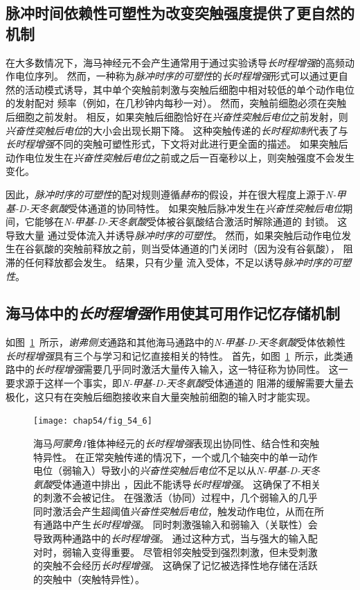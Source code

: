 \subsection{脉冲时间依赖性可塑性为改变突触强度提供了更自然的机制}

在大多数情况下，海马神经元不会产生通常用于通过实验诱导\textit{长时程增强}的高频动作电位序列。
然而，一种称为\textit{脉冲时序的可塑性}的\textit{长时程增强}形式可以通过更自然的活动模式诱导，其中单个突触前刺激与突触后细胞中相对较低的单个动作电位的发射配对 频率（例如，在几秒钟内每秒一对）。
然而，突触前细胞必须在突触后细胞之前发射。
相反，如果突触后细胞恰好在\textit{兴奋性突触后电位}之前发射，则\textit{兴奋性突触后电位}的大小会出现长期下降。
这种突触传递的\textit{长时程抑制}代表了与\textit{长时程增强}不同的突触可塑性形式，下文将对此进行更全面的描述。
如果突触后动作电位发生在\textit{兴奋性突触后电位}之前或之后一百毫秒以上，则突触强度不会发生变化。


因此，\textit{脉冲时序的可塑性}的配对规则遵循\textit{赫布}的假设，并在很大程度上源于\textit{N-甲基-D-天冬氨酸}受体通道的协同特性。
如果突触后脉冲发生在\textit{兴奋性突触后电位}期间，它能够在\textit{N-甲基-D-天冬氨酸}受体被谷氨酸结合激活时解除通道的  封锁。
这导致大量  通过受体流入并诱导\textit{脉冲时序的可塑性}。
然而，如果突触后动作电位发生在谷氨酸的突触前释放之前，则当受体通道的门关闭时（因为没有谷氨酸）， 阻滞的任何释放都会发生。
结果，只有少量  流入受体，不足以诱导\textit{脉冲时序的可塑性}。



\subsection{海马体中的\textit{长时程增强}作用使其可用作记忆存储机制}

如图~\ref{fig:54_6}~所示，\textit{谢弗侧支}通路和其他海马通路中的\textit{N-甲基-D-天冬氨酸}受体依赖性\textit{长时程增强}具有三个与学习和记忆直接相关的特性。
首先，如图~\ref{fig:54_6}~所示，此类通路中的\textit{长时程增强}需要几乎同时激活大量传入输入，这一特征称为协同性。
这一要求源于这样一个事实，即\textit{N-甲基-D-天冬氨酸}受体通道的  阻滞的缓解需要大量去极化，这只有在突触后细胞接收来自大量突触前细胞的输入时才能实现。


\begin{figure}[htbp]
	\centering
	\texttt{[image: chap54/fig\_54\_6]}
	\caption{海马\textit{阿蒙角1}锥体神经元的\textit{长时程增强}表现出协同性、结合性和突触特异性。
		在正常突触传递的情况下，一个或几个轴突中的单一动作电位（弱输入）导致小的\textit{兴奋性突触后电位}不足以从\textit{N-甲基-D-天冬氨酸}受体通道中排出 ，因此不能诱导\textit{长时程增强}。
		这确保了不相关的刺激不会被记住。 在强激活（协同）过程中，几个弱输入的几乎同时激活会产生超阈值\textit{兴奋性突触后电位}，触发动作电位，从而在所有通路中产生\textit{长时程增强}。
		同时刺激强输入和弱输入（关联性）会导致两种通路中的\textit{长时程增强}。
		通过这种方式，当与强大的输入配对时，弱输入变得重要。
		尽管相邻突触受到强烈刺激，但未受刺激的突触不会经历\textit{长时程增强}。
		这确保了记忆被选择性地存储在活跃的突触中（突触特异性）。}
	\label{fig:54_6}
\end{figure}


